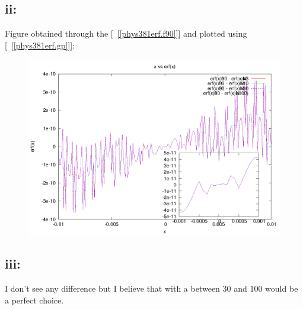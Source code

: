 \documentclass[twocolumn]{article}
\begin{document}
\subsection{ii:}		
\onecolumn
{
Figure obtained through the [{~\ref{[phys381erf.f90]}}] and plotted using [~\ref{[phys381erf.gp]}]:\\
\begin{figure}[!h]
\includegraphics[width=1.1\textwidth]{Plot1.png}
\end{figure}
}
\twocolumn
\subsection{iii:}
I don't see any difference but I believe that with a between 30 and 100 would be a perfect choice.
\end{document}
